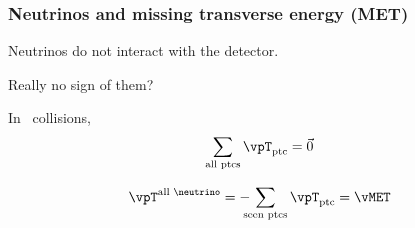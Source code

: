 \begin{frame}
\frametitle{Neutrinos and missing transverse energy (MET)}

\manip Neutrinos do not interact with the detector.

\manip Really no sign of them?

\pause

\manip In \proton\proton\ collisions, %
\begin{equation*}
\sum_\text{all ptcs} \vpT_\text{ptc} = \vec{0}
\end{equation*}

\pause\bigskip
\begin{equation*}
\vpT^\text{all \neutrino} = - \!\!\!\! \sum_\text{seen ptcs} \vpT_\text{ptc} = \vMET
\end{equation*}

\end{frame}
